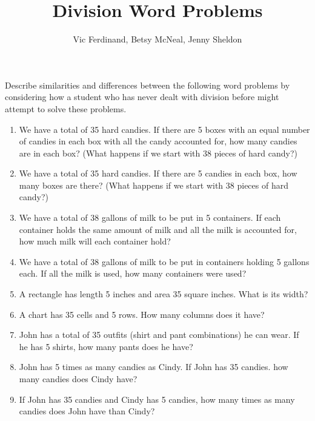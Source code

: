 \documentclass[nooutcomes]{ximera}
\title{Division Word Problems}
\author{Vic Ferdinand, Betsy McNeal, Jenny Sheldon}
\begin{document}
\begin{abstract} \end{abstract}
\maketitle



\begin{problem}
Describe similarities and differences between the following word problems by considering how a student who has never dealt with division before might attempt to solve these problems.

\begin{enumerate}
\item We have a total of 35 hard candies.  If there are 5 boxes with an equal number of candies in each box with all the candy accounted for, how many candies are in each box? (What happens if we start with 38 pieces of hard candy?)

\item We have a total of 35 hard candies.  If there are 5 candies in each box, how many boxes are there? (What happens if we start with 38 pieces of hard candy?)

\item We have a total of 38 gallons of milk to be put in 5 containers.  If each container holds the same amount of milk and all the milk is accounted for, how much milk will each container hold?

\item We have a total of 38 gallons of milk to be put in containers holding 5 gallons each.  If all the milk is used, how many containers were used?


\item  A rectangle has length 5 inches and area 35 square inches.  What is its width?


\item  A chart has 35 cells and 5 rows.  How many columns does it have?


\item John has a total of 35 outfits (shirt and pant combinations) he can wear.  If he has 5 shirts, how many pants does he have?

\item John has 5 times as many candies as Cindy.  If John has 35 candies. how many candies does Cindy have?
\item If John has 35 candies and Cindy has 5 candies, how many times as many candies does John have than Cindy?
\end{enumerate}

\end{problem}
\end{document}
